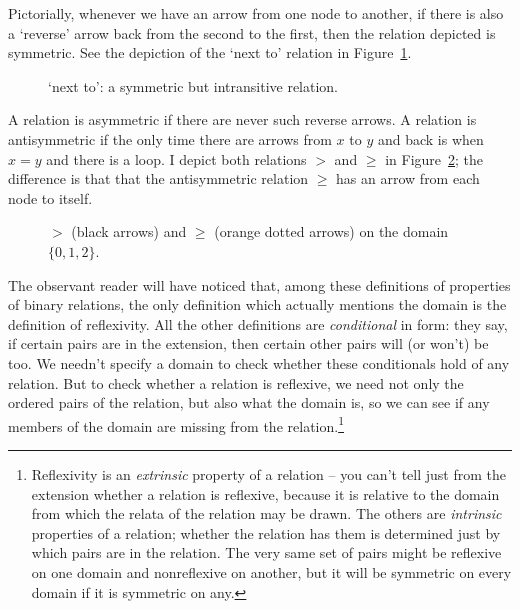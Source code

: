 \begin{earg}
Pictorially, whenever we have an arrow from one node to another, if there is also a `reverse' arrow back from the second to the first, then the relation depicted is symmetric. See the depiction of the `next to' relation in Figure~\ref{fig:nextto}. 
\begin{figure}[b]
	\caption{`next to': a symmetric but intransitive relation.\label{fig:nextto}}
\end{figure} A relation is asymmetric if there are never such reverse arrows. A relation is antisymmetric if the only time there are arrows from $x$ to $y$ and back is when $x=y$ and there is a loop. I depict both relations $>$ and $≥$ in Figure~\ref{fig:gg}; the difference is that that the antisymmetric relation $≥$ has an arrow from each node to itself.
\begin{figure}[t]
	\caption{$>$ (black arrows) and $≥$ (orange dotted arrows) on the domain $\{0,1,2\}$.\label{fig:gg}}
\end{figure}

The observant reader will have noticed that, among these definitions of properties of binary relations, the only definition which actually mentions the domain is the definition of reflexivity. All the other definitions are \emph{conditional} in form: they say, if certain pairs are in the extension, then certain other pairs will (or won't) be too. We needn’t specify a domain to check whether these conditionals hold of any relation. But to check whether a relation is reflexive, we need not only the ordered pairs of the relation, but also what the domain is, so we can see if any members of the domain are missing from the relation.\footnote{Reflexivity is an \emph{extrinsic} property of a relation – you can't tell just from the extension whether a relation is reflexive, because it is relative to the domain from which the relata of the relation may be drawn. The others are \emph{intrinsic} properties of a relation; whether the relation has them is determined just by which pairs are in the relation. The very same set of pairs might be reflexive on one domain and nonreflexive on another, but it will be symmetric on every domain if it is symmetric on any.}


\end{earg}
